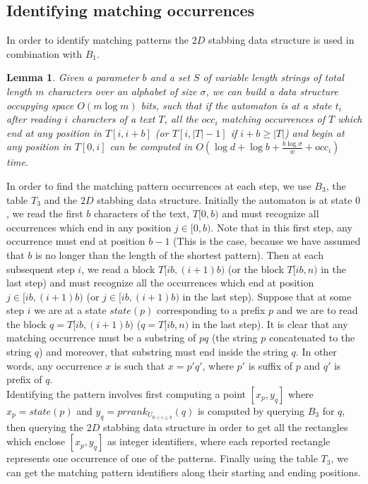 \documentclass{article}
\newcommand{\?}{\mskip1.5mu}
\newtheorem{lemma}{Lemma}
\begin{document}
\subsection{Identifying matching occurrences}
\label{subsec:ident_occ}
In order to identify matching patterns the $2D$ stabbing data structure is used in combination with $B_1$. 
\begin{lemma}
\label{lemma:report1_lemma}
Given a parameter $b$ and a set $S$ of variable length strings of total length $m$ characters over an alphabet of size $\sigma$, we can build a data structure occupying space $O(m \log m)$ bits, such that if the automaton is at a state $t_i$ after reading $i$ characters of a text $T$, all the $occ_i$ matching occurrences of $T$ which end at any position in $T[i,i+b]$ (or $T[i,|T|-1]$ if $i+b\geq |T|$) and begin at any position in $T[0,i]$ can be computed in $O(\log d+\log b+\frac{b\log\sigma}{w}+occ_i)$ time. 
\end{lemma}
In order to find the matching pattern occurrences at each step, we use $B_3$, the table $T_3$ and the $2D$ stabbing data structure.
Initially the automaton is at state $0$, we read the first $b$ characters of the text, $T[0,b)$ and must recognize all occurrences which end in any position $j\in[0,b)$. Note that in this first step, any occurrence must end at position $b-1$ (This is the case, because we have assumed that $b$ is no longer than the length of the shortest pattern). Then at each subsequent step $i$, we read a block $T[ib,(i+1)b)$ (or the block $T[ib,n)$ in the last step) and must recognize all the occurrences which end at position $j\in[ib,(i+1)b)$ (or $j\in[ib,(i+1)b)$ in the last step). Suppose that at some step $i$ we are at a state $state(p)$ corresponding to a prefix $p$ and we are to read the block $q=T[ib,(i+1)b)$ ($q=T[ib,n)$ in the last step). It is clear that any matching occurrence must be a substring of $pq$ (the string $p$ concatenated to the string $q$) and moreover, that substring must end inside the string $q$. In other words, any occurrence $x$ is such that $x=p'q'$, where $p'$ is suffix of $p$ and $q'$ is prefix of $q$. 
\\
Identifying the pattern involves first computing a point $[x_p,y_q]$ where $x_p=state(p)$ and $y_q=prrank_{U_{0<i\leq b}}(q)$ is computed by querying $B_3$ for $q$, then querying the $2D$ stabbing data structure in order to get all the rectangles which enclose $[x_p,y_q]$ as integer identifiers, where each reported rectangle represents one occurrence of one of the patterns. Finally using the table $T_3$, we can get the matching pattern identifiers along their starting and ending positions. 
\end{document}
